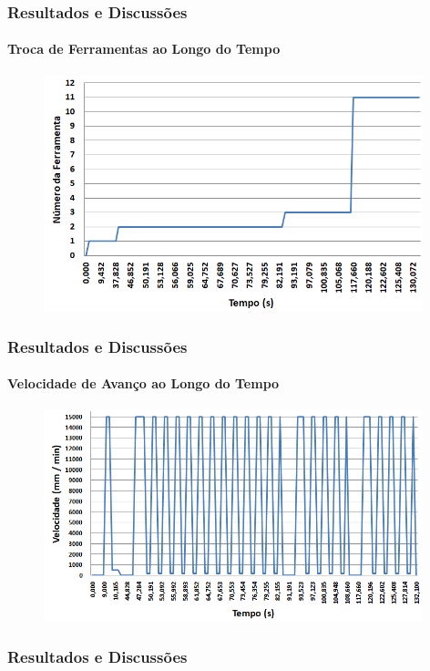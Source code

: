 \documentclass[aspectratio=169]{beamer}
\begin{document}
{\begin{frame}[fragile]
\end{frame}


\begin{frame}[fragile]
  \frametitle{Resultados e Discussões}
  \framesubtitle{Troca de Ferramentas ao Longo do Tempo}

  \begin{figure}[H]
    \centering
    \includegraphics[width=110mm]{images/tool-number-values-graph.png}
  \end{figure}

\end{frame}


\begin{frame}[fragile]
  \frametitle{Resultados e Discussões}
  \framesubtitle{Velocidade de Avanço ao Longo do Tempo}

  \begin{figure}[H]
    \centering
    \includegraphics[width=110mm]{images/feed-values-graph.png}
  \end{figure}

\end{frame}


\begin{frame}[fragile]
  \frametitle{Resultados e Discussões}


\end{frame}}
\end{document}

